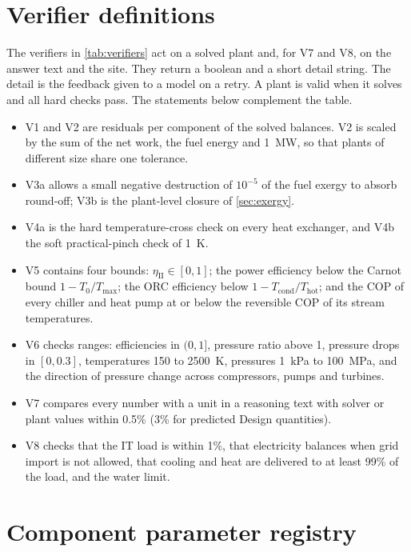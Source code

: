 \section{Verifier definitions}\label{app:verifiers}

The verifiers in \cref{tab:verifiers} act on a solved plant and, for V7 and V8, on the answer text and the site. They return a boolean and a short detail string. The detail is the feedback given to a model on a retry. A plant is valid when it solves and all hard checks pass. The statements below complement the table.
\begin{itemize}[leftmargin=*,itemsep=1pt]
\item V1 and V2 are residuals per component of the solved balances. V2 is scaled by the sum of the net work, the fuel energy and 1~MW, so that plants of different size share one tolerance.
\item V3a allows a small negative destruction of $10^{-5}$ of the fuel exergy to absorb round-off; V3b is the plant-level closure of \cref{sec:exergy}.
\item V4a is the hard temperature-cross check on every heat exchanger, and V4b the soft practical-pinch check of 1~K.
\item V5 contains four bounds: $\eta_{\mathrm{II}}\in[0,1]$; the power efficiency below the Carnot bound $1-T_0/T_{\max}$; the ORC efficiency below $1-T_{\mathrm{cond}}/T_{\mathrm{hot}}$; and the COP of every chiller and heat pump at or below the reversible COP of its stream temperatures.
\item V6 checks ranges: efficiencies in $(0,1]$, pressure ratio above 1, pressure drops in $[0,0.3]$, temperatures 150 to 2500~K, pressures 1~kPa to 100~MPa, and the direction of pressure change across compressors, pumps and turbines.
\item V7 compares every number with a unit in a reasoning text with solver or plant values within 0.5\% (3\% for predicted Design quantities).
\item V8 checks that the IT load is within 1\%, that electricity balances when grid import is not allowed, that cooling and heat are delivered to at least 99\% of the load, and the water limit.
\end{itemize}

\section{Component parameter registry}\label{app:registry}

